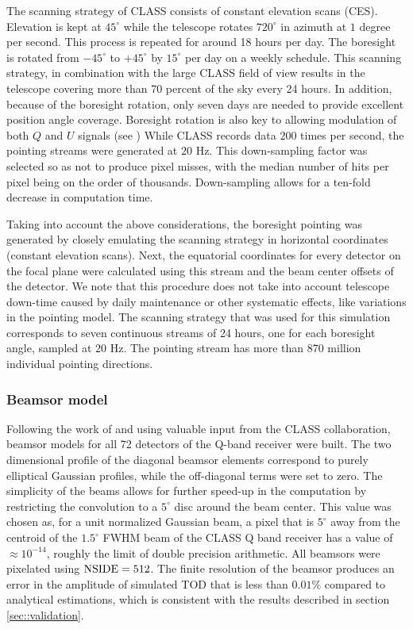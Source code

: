\documentclass[a4paper,11pt]{article}
\begin{document}
The scanning strategy of CLASS consists of constant elevation scans (CES). Elevation is kept at $45^{\circ}$ while the telescope rotates $720^\circ$ in azimuth at $1$ degree per second. This process is repeated for around 18 hours per day. The boresight is rotated from $-45^{\circ}$ to $+45^{\circ}$ by $15^{\circ}$ per day on a weekly schedule. This scanning strategy, in combination with the large CLASS field of view results in the telescope covering more than 70 percent of the sky every 24 hours. In addition, because of the boresight rotation, only seven days are needed to provide excellent position angle coverage. Boresight rotation is also key to allowing modulation of both $Q$ and $U$ signals (see \cite{2016SPIE.9914E..1KH}) While CLASS records data $200$ times per second, the pointing streams were generated at $20$ Hz. This down-sampling factor was selected so as not to produce pixel misses, with the median number of hits per pixel being on the order of thousands. Down-sampling allows for a ten-fold decrease in computation time.

Taking into account the above considerations, the boresight pointing was generated by closely emulating the scanning strategy in horizontal coordinates (constant elevation scans). Next, the equatorial coordinates for every detector on the focal plane were calculated using this stream and the beam center offsets of the detector. We note that this procedure does not take into account telescope down-time caused by daily maintenance or other systematic effects, like variations in the pointing model. The scanning strategy that was used for this simulation corresponds to seven continuous streams of 24 hours, one for each boresight angle, sampled at $20$ Hz. The pointing stream has more than 870 million individual pointing directions. 

\subsubsection{Beamsor model}

Following the work of \cite{2012SPIE.8452E..20E} and using valuable input from the CLASS collaboration, beamsor models for all 72 detectors of the Q-band receiver were built. The two dimensional profile of the diagonal beamsor elements correspond to purely elliptical Gaussian profiles, while the off-diagonal terms were set to zero. The simplicity of the beams allows for further speed-up in the computation by restricting the convolution to a $5^\circ$ disc around the beam center. This value was chosen as, for a unit normalized Gaussian beam, a pixel that is $5^\circ$ away from the centroid of the $1.5^{\circ}$ FWHM beam of the CLASS Q band receiver has a value of $\approx 10^{-14}$, roughly the limit of double precision arithmetic. All beamsors were pixelated using $\rm{NSIDE}=512$. The finite resolution of the beamsor produces an error in the amplitude of simulated TOD that is less than $0.01\%$ compared to analytical estimations, which is consistent with the results described in section \ref{sec::validation}.
\end{document}
